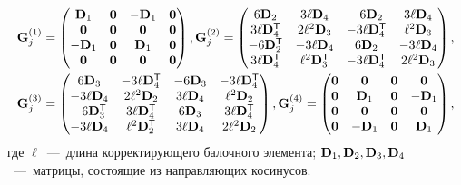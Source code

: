 \begin{equation*}
	\begin{gathered}
	\mathbf{G}_j^{(1)} =
	\begin{pmatrix}
		\mathbf{D}_1 & \mathbf{0} & -\mathbf{D}_1 & \mathbf{0} \\
		\mathbf{0} & \mathbf{0} & \mathbf{0} & \mathbf{0} \\
		-\mathbf{D}_1 & \mathbf{0} & \mathbf{D}_1 & \mathbf{0} \\
		\mathbf{0} & \mathbf{0} & \mathbf{0} & \mathbf{0} \\
	\end{pmatrix},
	\mathbf{G}_j^{(2)} =
	\begin{pmatrix}
		6 \mathbf{D}_2 & 3 \ell \mathbf{D}_4 & -6 \mathbf{D}_2 & 3 \ell \mathbf{D}_4 \\
		3 \ell \mathbf{D} ^ \mathsf{T}_4 & 2 \ell ^ 2 \mathbf{D}_3 & -3 \ell \mathbf{D} ^ \mathsf{T}_4 & \ell ^ 2 \mathbf{D}_3 \\
		-6 \mathbf{D} ^ \mathsf{T}_2 & -3 \ell \mathbf{D}_4 & 6 \mathbf{D}_2 & -3 \ell \mathbf{D}_4 \\
		3 \ell \mathbf{D} ^ \mathsf{T}_4 & \ell ^ 2 \mathbf{D} ^ \mathsf{T}_3 & -3 \ell \mathbf{D} ^ \mathsf{T}_4 & 2 \ell ^ 2 \mathbf{D}_3
	\end{pmatrix}, \\
	\mathbf{G}_j^{(3)} =
	\begin{pmatrix}
		6 \mathbf{D}_3 & -3 \ell \mathbf{D} ^ \mathsf{T}_4 & -6 \mathbf{D}_3 & -3 \ell \mathbf{D} ^ \mathsf{T}_4 \\
		-3 \ell \mathbf{D}_4 & 2 \ell ^ 2 \mathbf{D}_2 & 3 \ell \mathbf{D}_4 & \ell ^ 2 \mathbf{D}_2 \\
		-6 \mathbf{D} ^ \mathsf{T}_3 & 3 \ell \mathbf{D} ^ \mathsf{T}_4 & 6 \mathbf{D}_3 & 3 \ell \mathbf{D} ^ \mathsf{T}_4 \\
		-3 \ell \mathbf{D}_4 & \ell ^ 2 \mathbf{D} ^ \mathsf{T}_2 & 3 \ell \mathbf{D}_4 & 2 \ell ^ 2 \mathbf{D}_2
	\end{pmatrix},
	\mathbf{G}_j^{(4)} =
	\begin{pmatrix}
		\mathbf{0} & \mathbf{0} & \mathbf{0} & \mathbf{0} \\
		\mathbf{0} & \mathbf{D}_1 & \mathbf{0} & -\mathbf{D}_1 \\
		\mathbf{0} & \mathbf{0} & \mathbf{0} & \mathbf{0} \\
		\mathbf{0} & -\mathbf{D}_1 & \mathbf{0} & \mathbf{D}_1 \\
	\end{pmatrix},
	\end{gathered}
\end{equation*}
где $ \ell $~---~длина корректирующего балочного элемента; $ \mathbf{D}_1, \mathbf{D}_2, \mathbf{D}_3, \mathbf{D}_4 $~---~матрицы, состоящие из направляющих косинусов.

